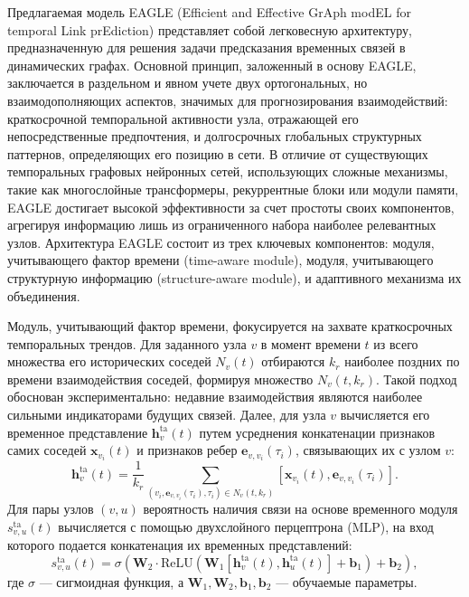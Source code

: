 \documentclass[a4paper,12pt]{extarticle}
\begin{document}
Предлагаемая модель EAGLE (Efficient and Effective GrAph modEL for temporal Link prEdiction) представляет собой легковесную архитектуру, предназначенную для решения задачи предсказания временных связей в динамических графах. Основной принцип, заложенный в основу EAGLE, заключается в раздельном и явном учете двух ортогональных, но взаимодополняющих аспектов, значимых для прогнозирования взаимодействий: краткосрочной темпоральной активности узла, отражающей его непосредственные предпочтения, и долгосрочных глобальных структурных паттернов, определяющих его позицию в сети. В отличие от существующих темпоральных графовых нейронных сетей, использующих сложные механизмы, такие как многослойные трансформеры, рекуррентные блоки или модули памяти, EAGLE достигает высокой эффективности за счет простоты своих компонентов, агрегируя информацию лишь из ограниченного набора наиболее релевантных узлов. Архитектура EAGLE состоит из трех ключевых компонентов: модуля, учитывающего фактор времени (time-aware module), модуля, учитывающего структурную информацию (structure-aware module), и адаптивного механизма их объединения.

Модуль, учитывающий фактор времени, фокусируется на захвате краткосрочных темпоральных трендов. Для заданного узла \(v\) в момент времени \(t\) из всего множества его исторических соседей \(N_v(t)\) отбираются \(k_r\) наиболее поздних по времени взаимодействия соседей, формируя множество \(N_v(t, k_r)\). Такой подход обоснован экспериментально: недавние взаимодействия являются наиболее сильными индикаторами будущих связей. Далее, для узла \(v\) вычисляется его временное представление \(\mathbf{h}_v^{\text{ta}}(t)\) путем усреднения конкатенации признаков самих соседей \(\mathbf{x}_{v_i}(t)\) и признаков ребер \(\mathbf{e}_{v, v_i}(\tau_i)\), связывающих их с узлом \(v\):
\[
\mathbf{h}_v^{\text{ta}}(t) = \frac{1}{k_r} \sum_{(v_i, \mathbf{e}_{v, v_i}(\tau_i), \tau_i) \in N_v(t, k_r)} [\mathbf{x}_{v_i}(t), \mathbf{e}_{v, v_i}(\tau_i)].
\]
Для пары узлов \((v, u)\) вероятность наличия связи на основе временного модуля \(s_{v,u}^{\text{ta}}(t)\) вычисляется с помощью двухслойного перцептрона (MLP), на вход которого подается конкатенация их временных представлений:
\[
s_{v,u}^{\text{ta}}(t) = \sigma (\mathbf{W}_2 \cdot \text{ReLU}(\mathbf{W}_1 [\mathbf{h}_v^{\text{ta}}(t), \mathbf{h}_u^{\text{ta}}(t)] + \mathbf{b}_1) + \mathbf{b}_2),
\]
где \(\sigma\) — сигмоидная функция, а \(\mathbf{W}_1, \mathbf{W}_2, \mathbf{b}_1, \mathbf{b}_2\) — обучаемые параметры.
\end{document}
